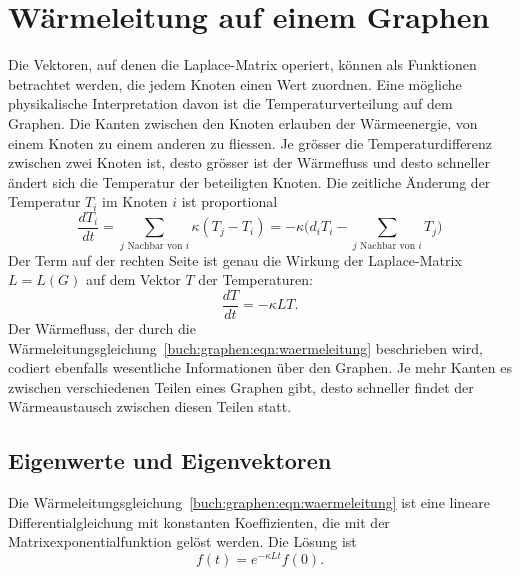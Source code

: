 %
%
%
\section{Wärmeleitung auf einem Graphen
\label{buch:section:waermeleitung-auf-einem-graphen}}
Die Vektoren, auf denen die Laplace-Matrix operiert, können
als Funktionen betrachtet werden, die jedem Knoten einen Wert zuordnen.
Eine mögliche physikalische Interpretation davon ist die Temperaturverteilung
auf dem Graphen.
%
Die Kanten zwischen den Knoten erlauben der Wärmeenergie, von einem Knoten
zu einem anderen zu fliessen.
Je grösser die Temperaturdifferenz zwischen zwei Knoten ist, desto
grösser ist der Wärmefluss und desto schneller ändert sich die Temperatur
der beteiligten Knoten.
Die zeitliche Änderung der Temperatur $T_i$ im Knoten $i$ ist proportional
\[
\frac{dT_i}{dt}
=
\sum_{\text{$j$ Nachbar von $i$}} \kappa (T_j-T_i)
=
-
\kappa
\biggl(
d_iT_i
-
\sum_{\text{$j$ Nachbar von $i$}} T_j
\biggr)
\]
Der Term auf der rechten Seite ist genau die Wirkung der 
Laplace-Matrix $L=L(G)$ auf dem Vektor $T$ der Temperaturen:
\begin{equation}
\frac{dT}{dt}
=
-\kappa L T.
\label{buch:graphen:eqn:waermeleitung}
\end{equation}
Der Wärmefluss, der durch die
Wärmeleitungsgleichung~\eqref{buch:graphen:eqn:waermeleitung} beschrieben
%
wird, codiert ebenfalls wesentliche Informationen über den Graphen.
Je mehr Kanten es zwischen verschiedenen Teilen eines Graphen gibt,
desto schneller findet der Wärmeaustausch zwischen diesen Teilen
statt.

\subsection{Eigenwerte und Eigenvektoren
\label{buch:subsection:ein-zyklischer-graph}}
Die Wärmeleitungsgleichung~\eqref{buch:graphen:eqn:waermeleitung} 
ist eine lineare Differentialgleichung mit konstanten Koeffizienten,
die mit der Matrixexponentialfunktion gelöst werden.
%
Die Lösung ist
\[
f(t) = e^{-\kappa Lt}f(0).
\]

